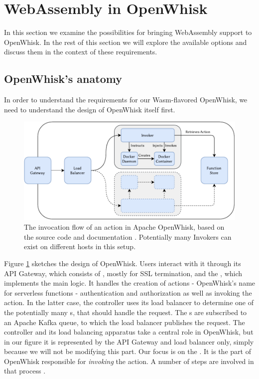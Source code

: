 \section{WebAssembly in OpenWhisk}

In this section we examine the possibilities for bringing WebAssembly support to OpenWhisk.
In the rest of this section we will explore the available options and discuss them in the context of these requirements.

\subsection{OpenWhisk's anatomy}

In order to understand the requirements for our Wasm-flavored OpenWhisk, we need to understand the design of OpenWhisk itself first.

\begin{figure}
    \centering
    \includegraphics[width=\textwidth]{figures/OpenWhiskActionInvocationFlow.pdf}
    \caption{The invocation flow of an action in Apache OpenWhisk, based on the source code and documentation \cite{OpenWhiskSystemDesign}. Potentially many Invokers can exist on different hosts in this setup.}
    \label{fig:openwhisk-action-invocation-flow}
\end{figure}

Figure \ref{fig:openwhisk-action-invocation-flow} sketches the design of OpenWhisk. Users interact with it through its API Gateway, which consists of , mostly for SSL termination, and the , which implements the main logic. It handles the creation of actions - OpenWhisk's name for serverless functions - authentication and authorization as well as invoking the action.
In the latter case, the controller uses its load balancer to determine one of the potentially many s, that should handle the request. The s are subscribed to an Apache Kafka queue, to which the load balancer publishes the request. The controller and its load balancing apparatus take a central role in OpenWhisk, but in our figure it is represented by the API Gateway and load balancer only, simply because we will not be modifying this part.
Our focus is on the . It is the part of OpenWhisk responsible for \emph{invoking} the action. A number of steps are involved in that process \cite{OpenWhiskSystemDesign}.

